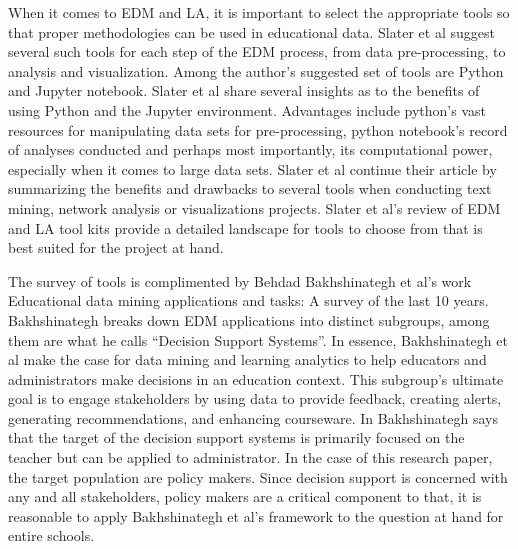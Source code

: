 \documentclass[]{article}
\begin{document}
When it comes to EDM and LA, it is important to select the appropriate tools so that proper methodologies can be used in educational data. Slater et al suggest several such tools for each step of the EDM process, from data pre-processing, to analysis and visualization. Among the author’s suggested set of tools are Python and Jupyter notebook. Slater et al share several insights as to the benefits of using Python and the Jupyter environment. Advantages include python’s vast resources for manipulating data sets for pre-processing, python notebook’s record of analyses conducted and perhaps most importantly, its computational power, especially when it comes to large data sets. Slater et al continue their article by summarizing the benefits and drawbacks to several tools when conducting text mining, network analysis or visualizations projects. Slater et al’s review of EDM and LA tool kits provide a detailed landscape for tools to choose from that is best suited for the project at hand.

The survey of tools is complimented by Behdad Bakhshinategh et al’s work Educational data mining applications and tasks: A survey of the last 10 years. Bakhshinategh breaks down EDM applications into distinct subgroups, among them are what he calls “Decision Support Systems”. In essence, Bakhshinategh et al make the case for data mining and learning analytics to help educators and administrators make decisions in an education context. This subgroup’s ultimate goal is to engage stakeholders by using data to provide feedback, creating alerts, generating recommendations, and enhancing courseware. In Bakhshinategh says that the target of the decision support systems is primarily focused on the teacher but can be applied to administrator. In the case of this research paper, the target population are policy makers. Since decision support is concerned with any and all stakeholders, policy makers are a critical component to that, it is reasonable to apply Bakhshinategh et al’s framework to the question at hand for entire schools. 
\end{document}
